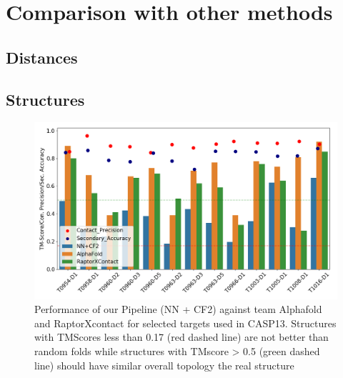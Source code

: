 \section{Comparison with other methods}
\subsection{Distances}
\subsection{Structures}

\begin{figure}
    \centering
    \includegraphics[width=\linewidth]{imgs_tomas/casp13_tm_contacts_sec.png}
    \caption{Performance of our Pipeline (NN + CF2) against team Alphafold and RaptorXcontact for selected targets used in CASP13. Structures with TMScores less than 0.17 (red dashed line) are not better than random folds while structures with TMscore > 0.5 (green dashed line) should have similar overall topology the real structure}
    \label{fig:casp_performance}
\end{figure}

